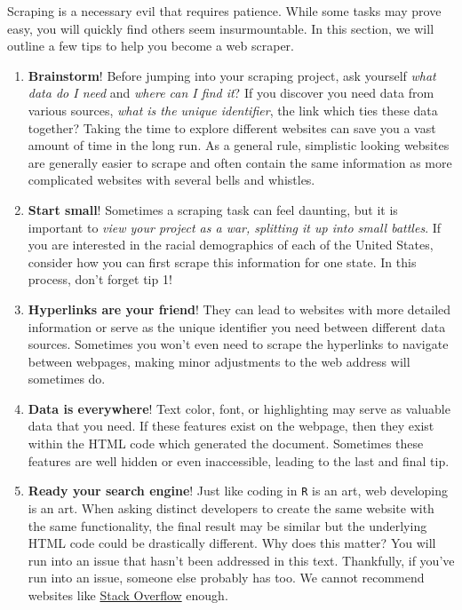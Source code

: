 \documentclass[
]{article}
\begin{document}
Scraping is a necessary evil that requires patience. While some tasks may prove easy, you will quickly find others seem insurmountable. In this section, we will outline a few tips to help you become a web scraper.

\begin{enumerate}
\def\labelenumi{\arabic{enumi}.}
\item
  \textbf{Brainstorm}! Before jumping into your scraping project, ask yourself \emph{what data do I need} and \emph{where can I find it}? If you discover you need data from various sources, \emph{what is the unique identifier}, the link which ties these data together? Taking the time to explore different websites can save you a vast amount of time in the long run. As a general rule, simplistic looking websites are generally easier to scrape and often contain the same information as more complicated websites with several bells and whistles.
\item
  \textbf{Start small}! Sometimes a scraping task can feel daunting, but it is important to \emph{view your project as a war, splitting it up into small battles}. If you are interested in the racial demographics of each of the United States, consider how you can first scrape this information for one state. In this process, don't forget tip 1!
\item
  \textbf{Hyperlinks are your friend}! They can lead to websites with more detailed information or serve as the unique identifier you need between different data sources. Sometimes you won't even need to scrape the hyperlinks to navigate between webpages, making minor adjustments to the web address will sometimes do.
\item
  \textbf{Data is everywhere}! Text color, font, or highlighting may serve as valuable data that you need. If these features exist on the webpage, then they exist within the HTML code which generated the document. Sometimes these features are well hidden or even inaccessible, leading to the last and final tip.
\item
  \textbf{Ready your search engine}! Just like coding in \texttt{R} is an art, web developing is an art. When asking distinct developers to create the same website with the same functionality, the final result may be similar but the underlying HTML code could be drastically different. Why does this matter? You will run into an issue that hasn't been addressed in this text. Thankfully, if you've run into an issue, someone else probably has too. We cannot recommend websites like \href{https://stackoverflow.com/}{Stack Overflow} enough.
\end{enumerate}
\end{document}
